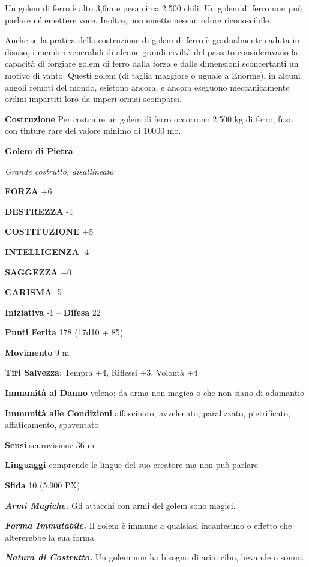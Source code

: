 \begin{multicols}{2}
Un golem di ferro è alto 3,6m e pesa circa 2.500 chili. Un golem di ferro non può parlare né emettere voce. Inoltre, non emette nessun odore riconoscibile.

Anche se la pratica della costruzione di golem di ferro è gradualmente caduta in disuso, i membri venerabili di alcune grandi civiltà del passato consideravano la capacità di forgiare golem di ferro dalla forza e dalle dimensioni sconcertanti un motivo di vanto. Questi golem (di taglia maggiore o uguale a Enorme), in alcuni angoli remoti del mondo, esistono ancora, e ancora eseguono meccanicamente ordini impartiti loro da imperi ormai scomparsi.

\textbf{Costruzione}
Per costruire un golem di ferro occorrono 2.500 kg di ferro, fuso con tinture rare del valore minimo di 10000 mo.


\medskip{}\textbf{Golem di Pietra}

\textit{Grande costrutto, disallineato}

\textbf{FORZA} +6

\textbf{DESTREZZA} -1

\textbf{COSTITUZIONE} +5

\textbf{INTELLIGENZA} -4

\textbf{SAGGEZZA} +0

\textbf{CARISMA} -5

\textbf{Iniziativa} -1 -- \textbf{Difesa} 22

\textbf{Punti Ferita} 178 (17d10 + 85)

\textbf{Movimento} 9 m

\textbf{Tiri Salvezza}: Tempra +4, Riflessi +3, Volontà +4

\textbf{Immunità al Danno} veleno; da arma non magica o che non siano di adamantio

\textbf{Immunità alle Condizioni} affascinato, avvelenato, paralizzato, pietrificato, affaticamento, spaventato

\textbf{Sensi} scurovisione 36 m

\textbf{Linguaggi} comprende le lingue del suo creatore ma non può parlare

\textbf{Sfida} 10 (5.900 PX)

\textit{\textbf{Armi Magiche.}} Gli attacchi con armi del golem sono magici.

\textit{\textbf{Forma Immutabile.}} Il golem è immune a qualsiasi incantesimo o effetto che altererebbe la sua forma.

\textit{\textbf{Natura di Costrutto.}} Un golem non ha bisogno di aria, cibo, bevande o sonno.


\end{multicols}
